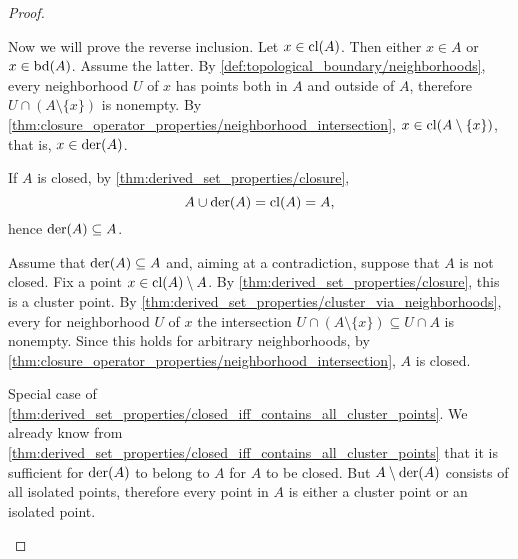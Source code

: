 \begin{proof}
\begin{description}
    Now we will prove the reverse inclusion. Let \( x \in \operatorname{cl}(A) \). Then either \( x \in A \) or \( x \in \operatorname{bd}(A) \). Assume the latter. By \cref{def:topological_boundary/neighborhoods}, every neighborhood \( U \) of \( x \) has points both in \( A \) and outside of \( A \), therefore \( U \cap (A \setminus \{ x \}) \) is nonempty. By \cref{thm:closure_operator_properties/neighborhood_intersection}, \( x \in \operatorname{cl}(A \setminus \{ x \}) \), that is, \( x \in \operatorname{der}(A) \).

    \mbox{}
    \begin{description}
      \Implies If \( A \) is closed, by \cref{thm:derived_set_properties/closure},
      \begin{equation*}
        A \cup \operatorname{der}(A) = \operatorname{cl}(A) = A,
      \end{equation*}
      hence \( \operatorname{der}(A) \subseteq A \).

      \ImpliedBy Assume that \( \operatorname{der}(A) \subseteq A \) and, aiming at a contradiction, suppose that \( A \) is not closed. Fix a point \( x \in \operatorname{cl}(A) \setminus A \). By \cref{thm:derived_set_properties/closure}, this is a cluster point. By \cref{thm:derived_set_properties/cluster_via_neighborhoods}, every for neighborhood \( U \) of \( x \) the intersection \( U \cap (A \setminus \{ x \}) \subseteq U \cap A \) is nonempty. Since this holds for arbitrary neighborhoods, by \cref{thm:closure_operator_properties/neighborhood_intersection}, \( A \) is closed.
    \end{description}

    \mbox{}
    \begin{description}
      \Implies Special case of \cref{thm:derived_set_properties/closed_iff_contains_all_cluster_points}.
      \ImpliedBy We already know from \cref{thm:derived_set_properties/closed_iff_contains_all_cluster_points} that it is sufficient for \( \operatorname{der}(A) \) to belong to \( A \) for \( A \) to be closed. But \( A \setminus \operatorname{der}(A) \) consists of all isolated points, therefore every point in \( A \) is either a cluster point or an isolated point.
    \end{description}
  \end{description}
\end{proof}

